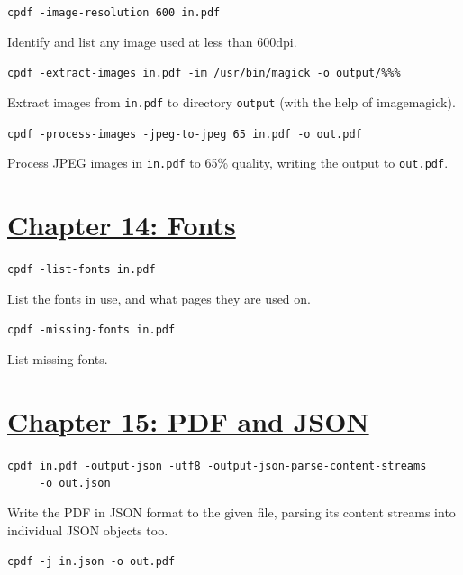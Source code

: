 \documentclass{book}
\begin{document}
\begin{framed}\noindent\texttt{cpdf -image-resolution 600 in.pdf}\end{framed}

\noindent Identify and list any image used at less than 600dpi.

\begin{framed}\noindent\texttt{cpdf -extract-images in.pdf -im /usr/bin/magick -o output/\%\%\%}\end{framed}

\noindent Extract images from \texttt{in.pdf} to directory \texttt{output} (with the help of imagemagick).

\begin{framed}\noindent\texttt{cpdf -process-images -jpeg-to-jpeg 65 in.pdf -o out.pdf}\end{framed}

\noindent Process JPEG images in \texttt{in.pdf} to 65\% quality, writing the output to \texttt{out.pdf}.

\section*{\hyperref[chap:14]{Chapter 14: Fonts}}

\begin{framed}\noindent\texttt{cpdf -list-fonts in.pdf}\end{framed}

\noindent List the fonts in use, and what pages they are used on.

\begin{framed}\noindent\texttt{cpdf -missing-fonts in.pdf}\end{framed}

\noindent List missing fonts.

\section*{\hyperref[chap:15]{Chapter 15: PDF and JSON}}

\begin{framed}
 \noindent\small\verb?cpdf in.pdf -output-json -utf8 -output-json-parse-content-streams?\\
 \noindent\small\verb?     -o out.json?
\end{framed}

\noindent Write the PDF in JSON format to the given file, parsing its content streams into individual JSON objects too.

\begin{framed}\noindent\texttt{cpdf -j in.json -o out.pdf}\end{framed}
\end{document}
